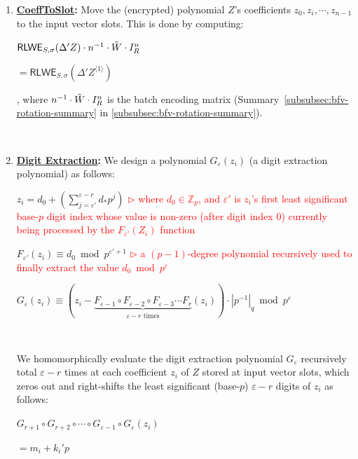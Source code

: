 \begin{tcolorbox}[title={\textbf{\tboxlabel{\ref*{subsubsec:bfv-bootstrapping-summary}} BFV Bootstrapping}}]
\begin{enumerate}
$ $

Now, we denote the modulus-switched noisy plaintext polynomial as $Z = p^{\varepsilon-r} M + E' + Kp^\varepsilon$.

$ $

\item \textbf{\textsf{\underline{CoeffToSlot}}:} Move the (encrypted) polynomial $Z$'s coefficients $z_0, z_i, \cdots, z_{n-1}$ to the input vector slots. This is done by computing: 

$\textsf{RLWE}_{S, \sigma}(\Delta' Z) \cdot n^{-1}\cdot \tilde{W}\cdot I_R^n$

$= \textsf{RLWE}_{S, \sigma}(\Delta' Z^{\langle1\rangle})$

, where $n^{-1}\cdot \tilde{W}\cdot I_R^n$ is the batch encoding matrix (Summary~\ref*{subsubsec:bfv-rotation-summary} in \autoref{subsubsec:bfv-rotation-summary}). 

$ $

\item \textbf{\underline{Digit Extraction}:} We design a polynomial $G_{\varepsilon}(z_i)$ (a digit extraction polynomial) as follows:

$z_i = d_0 + \left(\sum\limits_{j=\varepsilon'}^{\varepsilon-r} d_* p^j\right)$ \textcolor{red}{ $\rhd$ where $d_0 \in \mathbb{Z}_{p}$, and $\varepsilon'$ is $z_i$'s first least significant base-$p$ digit index whose value is non-zero (after digit index 0) currently being processed by the $F_{\varepsilon'}(Z_i)$ function}

$F_{\varepsilon'}(z_i) \equiv d_0 \bmod p^{\varepsilon'+1}$ \textcolor{red}{ $\rhd$ a $(p-1)$-degree polynomial recursively used to finally extract the value $d_0 \bmod p^{\varepsilon}$}

$G_{\varepsilon}(z_i) \equiv (z_i - \underbrace{F_{\varepsilon-1} \circ F_{\varepsilon-2} \circ F_{\varepsilon-3} \cdots F_{r}}_{\varepsilon - r \text{ times}} (z_i)) \cdot |p^{-1}|_q \bmod p^\varepsilon$

$ $



We homomorphically evaluate the digit extraction polynomial $G_{\varepsilon}$ recursively total $\varepsilon-r$ times at each coefficient $z_i$ of $Z$ stored at input vector slots, which zeros out and right-shifts the least significant (base-$p$) $\varepsilon-r$ digits of $z_i$ as follows:

$G_{r + 1} \circ G_{r + 2} \circ \cdots \circ G_{\varepsilon-1} \circ G_{\varepsilon} (z_i)$

$= m_i + k_i'p$


\end{enumerate}
\end{tcolorbox}
